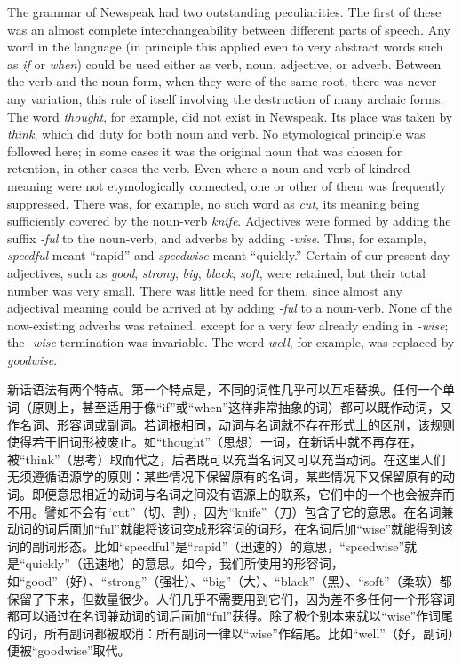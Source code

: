 \begin{paracol}{2}
\switchcolumn*

The grammar of Newspeak had two outstanding peculiarities. The first of
these was an almost complete interchangeability between different parts
of speech. Any word in the language (in principle this applied even to
very abstract words such as \emph{if} or \emph{when}) could be used
either as verb, noun, adjective, or adverb. Between the verb and the
noun form, when they were of the same root, there was never any
variation, this rule of itself involving the destruction of many archaic
forms. The word \emph{thought}, for example, did not exist in Newspeak.
Its place was taken by \emph{think}, which did duty for both noun and
verb. No etymological principle was followed here; in some cases it was
the original noun that was chosen for retention, in other cases the
verb. Even where a noun and verb of kindred meaning were not
etymologically connected, one or other of them was frequently
suppressed. There was, for example, no such word as \emph{cut}, its
meaning being sufficiently covered by the noun-verb \emph{knife}.
Adjectives were formed by adding the suffix \emph{-ful} to the
noun-verb, and adverbs by adding \emph{-wise}. Thus, for example,
\emph{speedful} meant ``rapid'' and \emph{speedwise} meant ``quickly.''
Certain of our present-day adjectives, such as \emph{good},
\emph{strong}, \emph{big}, \emph{black}, \emph{soft}, were retained, but
their total number was very small. There was little need for them, since
almost any adjectival meaning could be arrived at by adding \emph{-ful}
to a noun-verb. None of the now-existing adverbs was retained, except
for a very few already ending in \emph{-wise}; the \emph{-wise}
termination was invariable. The word \emph{well}, for example, was
replaced by \emph{goodwise}.

\switchcolumn

新话语法有两个特点。第一个特点是，不同的词性几乎可以互相替换。任何一个单词（原则上，甚至适用于像``if''或``when''这样非常抽象的词）都可以既作动词，又作名词、形容词或副词。若词根相同，动词与名词就不存在形式上的区别，该规则使得若干旧词形被废止。如``thought''（思想）一词，在新话中就不再存在，被``think''（思考）取而代之，后者既可以充当名词又可以充当动词。在这里人们无须遵循语源学的原则：某些情况下保留原有的名词，某些情况下又保留原有的动词。即便意思相近的动词与名词之间没有语源上的联系，它们中的一个也会被弃而不用。譬如不会有``cut''（切、割），因为``knife''（刀）包含了它的意思。在名词兼动词的词后面加``ful''就能将该词变成形容词的词形，在名词后加``wise''就能得到该词的副词形态。比如``speedful''是``rapid''（迅速的）的意思，``speedwise''就是``quickly''（迅速地）的意思。如今，我们所使用的形容词，如``good''（好）、``strong''（强壮）、``big''（大）、``black''（黑）、``soft''（柔软）都保留了下来，但数量很少。人们几乎不需要用到它们，因为差不多任何一个形容词都可以通过在名词兼动词的词后面加``ful''获得。除了极个别本来就以``wise''作词尾的词，所有副词都被取消：所有副词一律以``wise''作结尾。比如``well''（好，副词）便被``goodwise''取代。


\end{paracol}
